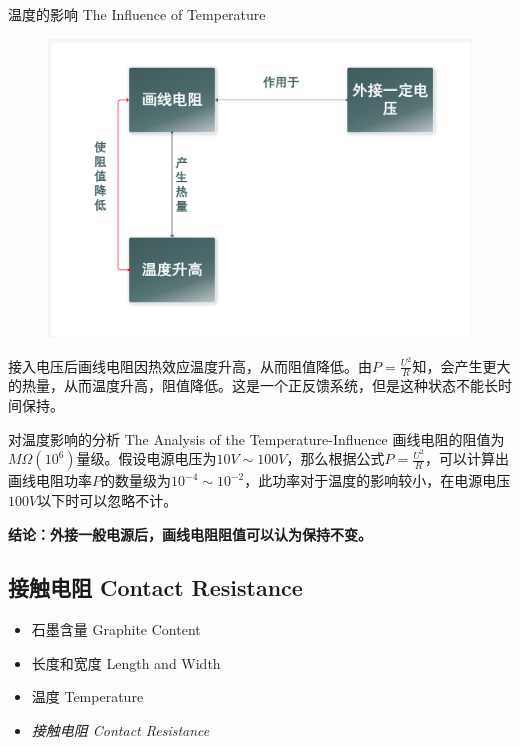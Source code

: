 \documentclass[10pt]{beamer}
\begin{document}
	\begin{frame}{温度的影响 The Influence of Temperature }
		\begin{figure}
			\centering
			\includegraphics[width=0.75\linewidth]{figs/1}
		\end{figure}
		\qquad 接入电压后画线电阻因热效应温度升高，从而阻值降低。由$ P=\frac{U^2}{R} $知，会产生更大的热量，从而温度升高，阻值降低。这是一个正反馈系统，但是这种状态不能长时间保持。
	\end{frame}
	
	\begin{frame}{对温度影响的分析 The Analysis of the Temperature-Influence}
		\qquad 画线电阻的阻值为$ M\Omega(10^6) $量级。假设电源电压为$ 10V\sim 100V $，那么根据公式$ P=\frac{U^2}{R} $，可以计算出画线电阻功率$ P $的数量级为$ 10^{-4}\sim 10^{-2} $，此功率对于温度的影响较小，在电源电压$ 100V $以下时可以忽略不计。
		
		\bigskip
		\pause
		{\large \textbf{结论：外接一般电源后，画线电阻阻值可以认为保持不变。}}
	\end{frame}
	\subsection{接触电阻 Contact Resistance}
	\begin{frame}%
		\begin{itemize}
			\item 石墨含量 Graphite Content
			\item 长度和宽度 Length and Width
			\item 温度 Temperature
			\item {\LARGE \textit{接触电阻 Contact Resistance}}
		\end{itemize}
	\end{frame}
	
\end{document}
